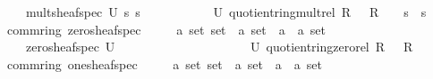 \documentclass[12pt]{scrartcl}
\begin{document}
\begin{isabelle}
\ \ \ \ \ {\isachardoublequoteopen}mult{\isacharunderscore}{\kern0pt}sheaf{\isacharunderscore}{\kern0pt}spec\ U\ s\ s{\isacharprime}{\kern0pt}\ {\isasymequiv}\ \isanewline
\ \ \ \ \ \ \ \ \ {\isasymlambda}{\isasympp}{\isasymin}U{\isachardot}{\kern0pt}\ quotient{\isacharunderscore}{\kern0pt}ring{\isachardot}{\kern0pt}mult{\isacharunderscore}{\kern0pt}rel\ {\isacharparenleft}{\kern0pt}R\ {\isasymsetminus}\ {\isasympp}{\isacharparenright}{\kern0pt}\ R\ {\isacharparenleft}{\kern0pt}{\isacharplus}{\kern0pt}{\isacharparenright}{\kern0pt}\ {\isacharparenleft}{\kern0pt}{\isasymcdot}{\isacharparenright}{\kern0pt}\ {\isasymzero}\ {\isacharparenleft}{\kern0pt}s\ {\isasympp}{\isacharparenright}{\kern0pt}\ {\isacharparenleft}{\kern0pt}s{\isacharprime}{\kern0pt}\ {\isasympp}{\isacharparenright}{\kern0pt}{\isachardoublequoteclose}\isanewline
\isanewline
{}\isamarkupfalse%
\ {\isacharparenleft}{\kern0pt}\ comm{\isacharunderscore}{\kern0pt}ring{\isacharparenright}{\kern0pt}\ zero{\isacharunderscore}{\kern0pt}sheaf{\isacharunderscore}{\kern0pt}spec\isanewline
\ \ \ \ {\isacharcolon}{\kern0pt}{\isacharcolon}{\kern0pt}\ {\isachardoublequoteopen}{\isacharprime}{\kern0pt}a\ set\ set\ {\isasymRightarrow}\ {\isacharparenleft}{\kern0pt}{\isacharprime}{\kern0pt}a\ set\ {\isasymRightarrow}\ {\isacharparenleft}{\kern0pt}{\isacharprime}{\kern0pt}a\ {\isasymtimes}\ {\isacharprime}{\kern0pt}a{\isacharparenright}{\kern0pt}\ set{\isacharparenright}{\kern0pt}{\isachardoublequoteclose}\isanewline
\ \ \ \ \ {\isachardoublequoteopen}zero{\isacharunderscore}{\kern0pt}sheaf{\isacharunderscore}{\kern0pt}spec\ U\ {\isasymequiv}\ \isanewline
\ \ \ \ \ \ \ \ \ \ \ \ \ \ \ \ \ \ \ {\isasymlambda}{\isasympp}{\isasymin}U{\isachardot}{\kern0pt}\ quotient{\isacharunderscore}{\kern0pt}ring{\isachardot}{\kern0pt}zero{\isacharunderscore}{\kern0pt}rel\ {\isacharparenleft}{\kern0pt}R\ {\isasymsetminus}\ {\isasympp}{\isacharparenright}{\kern0pt}\ R\ {\isacharparenleft}{\kern0pt}{\isacharplus}{\kern0pt}{\isacharparenright}{\kern0pt}\ {\isacharparenleft}{\kern0pt}{\isasymcdot}{\isacharparenright}{\kern0pt}\ {\isasymzero}\ {\isasymone}{\isachardoublequoteclose}\isanewline
\isanewline
{}\isamarkupfalse%
\ {\isacharparenleft}{\kern0pt}\ comm{\isacharunderscore}{\kern0pt}ring{\isacharparenright}{\kern0pt}\ one{\isacharunderscore}{\kern0pt}sheaf{\isacharunderscore}{\kern0pt}spec\isanewline
\ \ \ \ {\isacharcolon}{\kern0pt}{\isacharcolon}{\kern0pt}\ {\isachardoublequoteopen}{\isacharprime}{\kern0pt}a\ set\ set\ {\isasymRightarrow}\ {\isacharparenleft}{\kern0pt}{\isacharprime}{\kern0pt}a\ set\ {\isasymRightarrow}\ {\isacharparenleft}{\kern0pt}{\isacharprime}{\kern0pt}a\ {\isasymtimes}\ {\isacharprime}{\kern0pt}a{\isacharparenright}{\kern0pt}\ set{\isacharparenright}{\kern0pt}{\isachardoublequoteclose}\isanewline

\end{isabelle}
\end{document}
